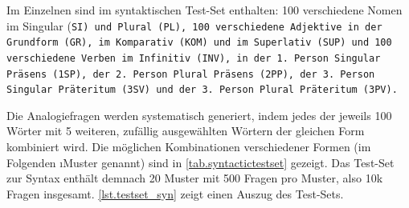 Im Einzelnen sind im syntaktischen Test-Set enthalten: 100 verschiedene Nomen im Singular (\tt{SI}) und Plural (\tt{PL}), 100 verschiedene Adjektive in der Grundform (\tt{GR}), im Komparativ (\tt{KOM}) und im Superlativ (\tt{SUP}) und 100 verschiedene Verben im Infinitiv (\tt{INV}), in der 1. Person Singular Präsens (\tt{1SP}), der 2. Person Plural Präsens (\tt{2PP}), der 3. Person Singular Präteritum (\tt{3SV}) und der 3. Person Plural Präteritum (\tt{3PV}).

Die Analogiefragen werden systematisch generiert, indem jedes der jeweils 100 Wörter mit 5 weiteren, zufällig ausgewählten Wörtern der gleichen Form kombiniert wird. Die möglichen Kombinationen verschiedener Formen (im Folgenden \i{Muster} genannt) sind in \autoref{tab.syntactictestset} gezeigt. Das Test-Set zur Syntax enthält demnach 20 Muster mit 500 Fragen pro Muster, also 10k Fragen insgesamt. \autoref{lst.testset_syn} zeigt einen Auszug des Test-Sets.

